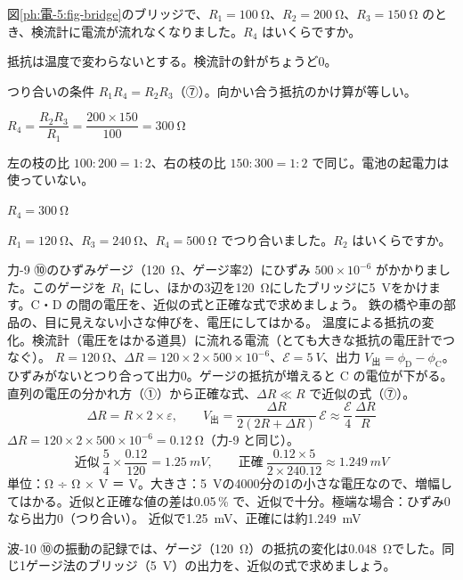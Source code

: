 \begin{reidai}[ホイートストンブリッジのつり合い]
\label{ph:電-5:ex9}図\ref{ph:電-5:fig-bridge}のブリッジで、$R_1=\qty{100}{\ohm}$、$R_2=\qty{200}{\ohm}$、$R_3=\qty{150}{\ohm}$ のとき、検流計に電流が流れなくなりました。$R_4$ はいくらですか。
\par{} 抵抗は温度で変わらないとする。検流計の針がちょうど0。
\par\kangaekata つり合いの条件 $R_1R_4=R_2R_3$（⑦）。向かい合う抵抗のかけ算が等しい。
\par\shiki $R_4=\dfrac{R_2R_3}{R_1}=\dfrac{200\times150}{100}=\qty{300}{\ohm}$
\par{} 左の枝の比 $100:200=1:2$、右の枝の比 $150:300=1:2$ で同じ。電池の起電力は使っていない。
\par\kotae $R_4=\qty{300}{\ohm}$
\end{reidai}
\begin{jibun}
$R_1=\qty{120}{\ohm}$、$R_3=\qty{240}{\ohm}$、$R_4=\qty{500}{\ohm}$ でつり合いました。$R_2$ はいくらですか。
\end{jibun}

\begin{phreidai}
\label{ph:電-5:ex10}力-9 ⑩のひずみゲージ（\qty{120}{\ohm}、ゲージ率2）にひずみ $500\times10^{-6}$ がかかりました。このゲージを $R_1$ にし、ほかの3辺を\qty{120}{\ohm}にしたブリッジに\qty{5}{V}をかけます。C・D の間の電圧を、近似の式と正確な式で求めましょう。
\phbamen
鉄の橋や車の部品の、目に見えない小さな伸びを、電圧にしてはかる。
\phmushi
温度による抵抗の変化。検流計（電圧をはかる道具）に流れる電流（とても大きな抵抗の電圧計でつなぐ）。
\phzu
$R=\qty{120}{\ohm}$、$\Delta R=120\times2\times500\times10^{-6}$、$\mathcal E=\qty{5}{V}$、出力 $V_{\text{出}}=\phi_{\mathrm D}-\phi_{\mathrm C}$。
\phriyu
ひずみがないとつり合って出力0。ゲージの抵抗が増えると C の電位が下がる。直列の電圧の分かれ方（①）から正確な式、$\Delta R\ll R$ で近似の式（⑦）。
\phtateru
\[ \Delta R=R\times2\times\varepsilon,\qquad V_{\text{出}}=\frac{\Delta R}{2(2R+\Delta R)}\,\mathcal E\approx\frac{\mathcal E}{4}\,\frac{\Delta R}{R} \]
\phtoku
$\Delta R=120\times2\times500\times10^{-6}=\qty{0.12}{\ohm}$（力-9 と同じ）。
\[ \text{近似}\ \frac{5}{4}\times\frac{0.12}{120}=\qty{1.25}{mV},\qquad \text{正確}\ \frac{0.12\times5}{2\times240.12}\approx\qty{1.249}{mV} \]
\phtashikame
単位：Ω ÷ Ω × V ＝ V。大きさ：\qty{5}{V}の4000分の1の小さな電圧なので、増幅してはかる。近似と正確な値の差は0.05\,\% で、近似で十分。極端な場合：ひずみ0なら出力0（つり合い）。
\kotae 近似で\qty{1.25}{mV}、正確には約\qty{1.249}{mV}
\end{phreidai}
\begin{jibun}
波-10 ⑩の振動の記録では、ゲージ（\qty{120}{\ohm}）の抵抗の変化は\qty{0.048}{\ohm}でした。同じ1ゲージ法のブリッジ（\qty{5}{V}）の出力を、近似の式で求めましょう。
\end{jibun}


